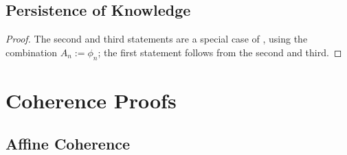 \documentclass[authordate,onecolumn,noenvironments]{miri-tech-article}
\numberwithin{equation}{subsection}
\newcommand{\aff}{A}
\begin{document}

\subsection{Persistence of Knowledge}\label{app:perkno}

\perkno*

\begin{proof}
  The second and third statements are a special case of , using the combination $\aff_n := \phi_n$; the first statement follows from the second and third.
\end{proof}



\section{Coherence Proofs}\label{app:coherenceproofs}




\subsection{Affine Coherence}\label{app:affcoh}

\affcoh*
\end{document}
